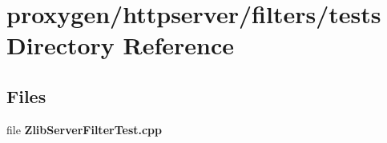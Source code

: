 \section{proxygen/httpserver/filters/tests Directory Reference}
\label{dir_9eb285a2e0cfe126a6ede760c54f57c8}
\subsection*{Files}
\begin{DoxyCompactItemize}
\item 
file {\bf Zlib\+Server\+Filter\+Test.\+cpp}
\end{DoxyCompactItemize}
